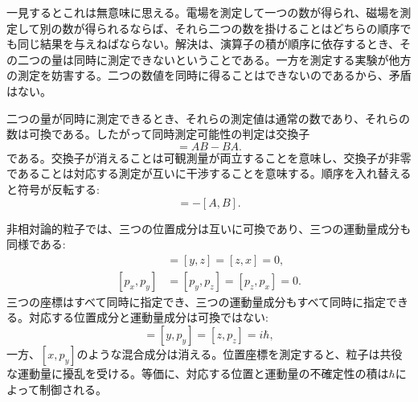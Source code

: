 一見するとこれは無意味に思える。電場を測定して一つの数が得られ、磁場を測定して別の数が得られるならば、それら二つの数を掛けることはどちらの順序でも同じ結果を与えねばならない。解決は、演算子の積が順序に依存するとき、その二つの量は同時に測定できないということである。一方を測定する実験が他方の測定を妨害する。二つの数値を同時に得ることはできないのであるから、矛盾はない。

二つの量が同時に測定できるとき、それらの測定値は通常の数であり、それらの数は可換である。したがって同時測定可能性の判定は交換子
\begin{equation}
[A,B]=AB-BA.
\end{equation}
である。交換子が消えることは可観測量が両立することを意味し、交換子が非零であることは対応する測定が互いに干渉することを意味する。順序を入れ替えると符号が反転する:
\begin{equation}
[B,A]=-[A,B].
\end{equation}

非相対論的粒子では、三つの位置成分は互いに可換であり、三つの運動量成分も同様である:
\begin{align}
[x,y]&=[y,z]=[z,x]=0,\\
[p_x,p_y]&=[p_y,p_z]=[p_z,p_x]=0.
\end{align}
三つの座標はすべて同時に指定でき、三つの運動量成分もすべて同時に指定できる。対応する位置成分と運動量成分は可換ではない:
\begin{equation}
[x,p_x]=[y,p_y]=[z,p_z]=i\hbar,
\end{equation}
一方、\([x,p_y]\)のような混合成分は消える。位置座標を測定すると、粒子は共役な運動量に擾乱を受ける。等価に、対応する位置と運動量の不確定性の積は\(\hbar\)によって制御される。

\begin{classroomqa}
\end{classroomqa}

\begin{classroomqa}
\end{classroomqa}

